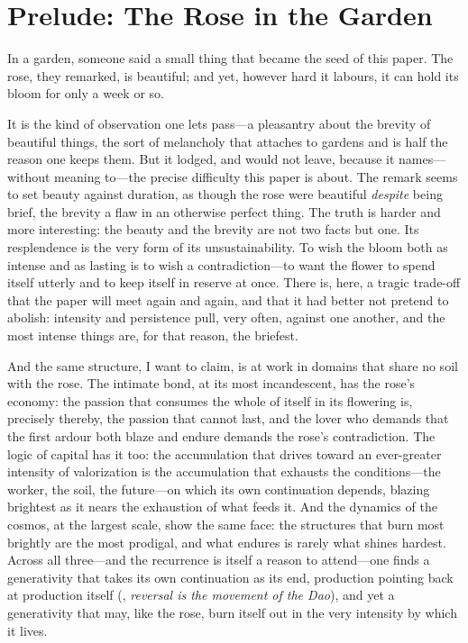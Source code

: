 \section{Prelude: The Rose in the Garden}
\label{p09:sec:prelude}

\noindent
In a garden, someone said a small thing that became the seed of this paper. The rose, they remarked, is beautiful; and yet, however hard it labours, it can hold its bloom for only a week or so.

It is the kind of observation one lets pass---a pleasantry about the brevity of beautiful things, the sort of melancholy that attaches to gardens and is half the reason one keeps them. But it lodged, and would not leave, because it names---without meaning to---the precise difficulty this paper is about. The remark seems to set beauty against duration, as though the rose were beautiful \emph{despite} being brief, the brevity a flaw in an otherwise perfect thing. The truth is harder and more interesting: the beauty and the brevity are not two facts but one.  Its resplendence is the very form of its unsustainability. To wish the bloom both as intense and as lasting is to wish a contradiction---to want the flower to spend itself utterly and to keep itself in reserve at once. There is, here, a tragic trade-off that the paper will meet again and again, and that it had better not pretend to abolish: intensity and persistence pull, very often, against one another, and the most intense things are, for that reason, the briefest.

And the same structure, I want to claim, is at work in domains that share no soil with the rose. The intimate bond, at its most incandescent, has the rose's economy: the passion that consumes the whole of itself in its flowering is, precisely thereby, the passion that cannot last, and the lover who demands that the first ardour both blaze and endure demands the rose's contradiction. The logic of capital has it too: the accumulation that drives toward an ever-greater intensity of valorization is the accumulation that exhausts the conditions---the worker, the soil, the future---on which its own continuation depends, blazing brightest as it nears the exhaustion of what feeds it. And the dynamics of the cosmos, at the largest scale, show the same face: the structures that burn most brightly are the most prodigal, and what endures is rarely what shines hardest. Across all three---and the recurrence is itself a reason to attend---one finds a generativity that takes its own continuation as its end, production pointing back at production itself (, \emph{reversal is the movement of the Dao}), and yet a generativity that may, like the rose, burn itself out in the very intensity by which it lives.

